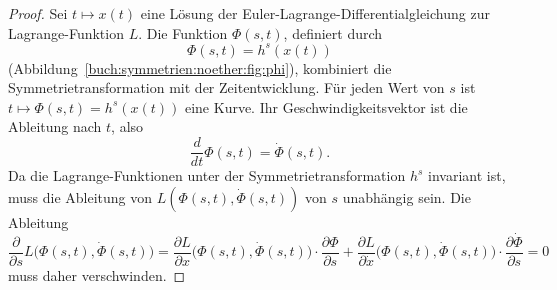 \begin{proof}
Sei $t\mapsto x(t)$ eine Lösung der Euler-Lagrange-Differentialgleichung
zur Lagrange-Funktion $L$.
Die Funktion $\Phi(s,t)$, definiert durch
\[
\Phi(s,t) = h^s(x(t))
\]
(Abbildung~\ref{buch:symmetrien:noether:fig:phi}),
kombiniert die Symmetrietransformation mit der Zeitentwicklung.
Für jeden Wert von $s$ ist $t\mapsto \Phi(s,t)=h^s(x(t))$ eine 
Kurve.
Ihr Geschwindigkeitsvektor ist die Ableitung nach $t$, also
\[
\frac{d}{dt} \Phi(s,t)
=
\dot{\Phi}(s,t).
\]
Da die Lagrange-Funktionen unter der Symmetrietransformation $h^s$ 
invariant ist, muss die Ableitung von $L(\Phi(s,t), \dot{\Phi}(s,t))$
von $s$ unabhängig sein.
Die Ableitung
\begin{equation}
\frac{\partial}{\partial s} L\bigl(\Phi(s,t), \dot{\Phi}(s,t)\bigr)
=
\frac{\partial L}{\partial x}\bigl(\Phi(s,t),\dot{\Phi}(s,t)\bigr)
\cdot
\frac{\partial \Phi}{\partial s}
+
\frac{\partial L}{\partial \dot{x}}\bigl(\Phi(s,t),\dot{\Phi}(s,t)\bigr)
\cdot
\frac{\partial \dot{\Phi}}{\partial s}
=0
\label{buch:symmetrioen:noether:eqn:sabl}
\end{equation}
muss daher verschwinden.


\end{proof}
